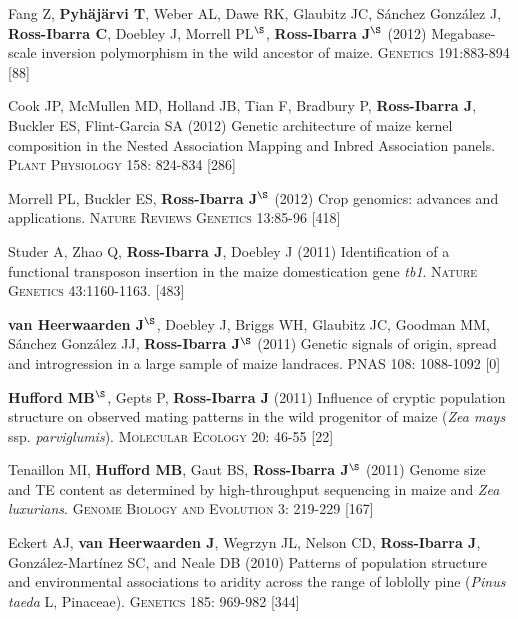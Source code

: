 \documentclass[letterpaper,10pt]{article}
\begin{document}
\begin{etaremune}
\item Fang Z, {\bf Pyh\"aj\"arvi T}, Weber AL, Dawe RK, Glaubitz JC, S\'{a}nchez Gonz\'{a}lez J, {\bf Ross-Ibarra C}, Doebley J, Morrell PL$^\S$, {\bf Ross-Ibarra J}$^\S$  (2012) Megabase-scale inversion polymorphism in the wild ancestor of maize. \textsc{Genetics} 191:883-894
 [88]\\


\item Cook JP, McMullen MD, Holland JB, Tian F, Bradbury P, {\bf Ross-Ibarra J}, Buckler ES, Flint-Garcia SA (2012) Genetic architecture of maize kernel composition in the Nested Association Mapping and Inbred Association panels. \textsc{Plant Physiology} 158: 824-834
 [286]\\

\item Morrell PL, Buckler ES, {\bf Ross-Ibarra J}$^\S$ (2012) Crop genomics: advances and applications.  \textsc{Nature Reviews Genetics} 13:85-96 %
 [418]\\


\item Studer A, Zhao Q, {\bf Ross-Ibarra J}, Doebley J (2011) Identification of a functional transposon insertion in the maize domestication gene \emph{tb1}.  \textsc{Nature Genetics} 43:1160-1163.
 [483]\\


\item {\bf van Heerwaarden J}$^\S$, Doebley J, Briggs WH, Glaubitz JC, Goodman MM, S\'{a}nchez Gonz\'{a}lez JJ, {\bf Ross-Ibarra J}$^\S$ (2011) Genetic signals of origin, spread and introgression in a large sample of maize landraces. PNAS 108: 1088-1092
 [0]\\


\item {\bf Hufford MB}$^\S$, Gepts P, {\bf Ross-Ibarra J} (2011) Influence of cryptic population structure on observed mating patterns in the wild progenitor of maize (\emph{Zea mays} ssp. \emph{parviglumis}).  \textsc{Molecular Ecology} 20: 46-55
 [22]\\


\item Tenaillon MI, {\bf Hufford MB}, Gaut BS, {\bf Ross-Ibarra J}$^\S$ (2011)  Genome size and TE content as determined by high-throughput sequencing in maize and \emph{Zea luxurians}.  \textsc{Genome Biology and Evolution } 3: 219-229
 [167]\\


\item Eckert AJ, {\bf van Heerwaarden J}, Wegrzyn JL, Nelson CD, {\bf Ross-Ibarra J}, Gonz\'{a}lez-Mart\'{i}nez SC, and Neale DB (2010) Patterns of population structure and environmental associations to aridity across the range of loblolly pine (\emph{Pinus taeda} L, Pinaceae).  \textsc{Genetics} 185: 969-982
 [344]\\



\end{etaremune}
\end{document}
